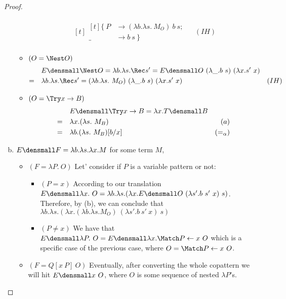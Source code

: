 \begin{proof}
\begin{enumerate}[(a)]
\begin{itemize}
\begin{align*}
\begin{aligned}[t]
\begin{aligned}[t]
                \{~
                P &\to (\lambda b. \lambda s.~ M_O) ~b~s; \\
                \_ &\to b~s
                ~\}
              \end{aligned}
            \end{aligned}  & (IH)
            \end{align*}
    \item $(O = \Nest O)$
        \begin{align*}
            & \quad E\den{\Nest O} = \lambda b. \lambda s. \Rec s' = E\den{O} ~ (\lambda \_. b ~ s) ~ (\lambda x. s' ~ x)\\
            =& \quad \lambda b. \lambda s. \Rec s' = (\lambda b. \lambda s.~ M_O) ~ (\lambda \_. b ~ s) ~ (\lambda x. s' ~ x) & (IH)
        \end{align*}
    \item $(O = \Try x \to B)$ 
        \begin{align*}
            & \quad E\den{\Try x \to B} = \lambda x. T\den{B}\\
            =& \quad \lambda x. (\lambda s.~ M_B) & (a) \\
            =& \quad \lambda b. (\lambda s.~ M_B)\subst{x}{b} & (=_{\alpha})
        \end{align*}
    \end{itemize}
\item $E\den{F} = \lambda b. \lambda s. \lambda x. M$ for some term $M$,
    \begin{itemize}
        \item $(F= \lambda P. ~O)$ Let' consider if $P$ is a variable pattern or not:
        \begin{itemize}
            \item $(P = x)$ According to our translation $E\den{\lambda x. ~O}=\lambda b. \lambda s. (\lambda x. E\den{O} ~ (\lambda s'. b ~ s' ~ x) ~ s)$.
            Therefore, by (b), we can conclude that $\lambda b. \lambda s. (\lambda x. (\lambda b. \lambda s. M_O) ~ (\lambda s'. b ~ s' ~ x) ~ s)$
            \item $(P \neq x)$ We have that $E\den{\lambda P. ~O}=E\den{\lambda x. \Match P \gets x ~ O}$ which is a specific case of the previous case, where $O=\Match P \gets x ~ O$.
        \end{itemize} 
        \item $(F= Q[x ~P] ~O)$ Eventually, after converting the whole copattern we will hit $E\den{x ~O}$, where $O$ is some sequence of nested $\lambda P$'s.

\end{itemize}
\end{enumerate}
\end{proof}
